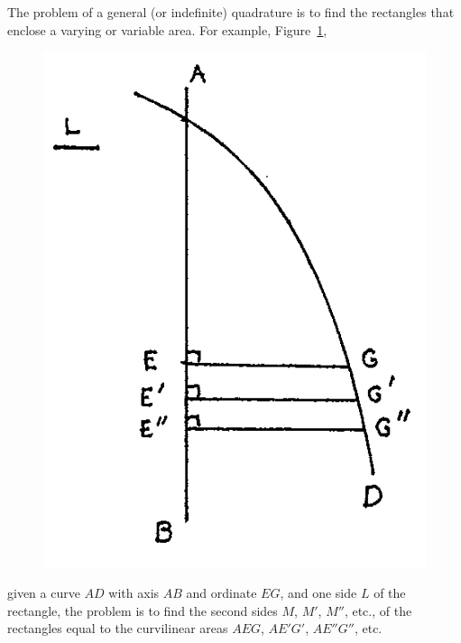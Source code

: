 \documentclass[polutonikogreek,english,twoside,openright]{article}
\begin{document}
The problem of a general (or indefinite) quadrature is to find the
rectangles that enclose a varying or variable area.  For example,
Figure~\ref{fig25b},
\begin{figure}[htp]
\begin{center}
\includegraphics[width=.5\textwidth]{fig/Figure29B}
\caption{}
\label{fig25b}
\end{center}
\end{figure} 
given a curve $AD$ with axis $AB$ and ordinate $EG$, and one side $L$
of the rectangle, the problem is to find the second sides $M$, $M'$,
$M''$, etc., of the rectangles equal to the curvilinear areas $AEG$,
$AE'G'$, $AE''G''$, etc.
 
\end{document}
